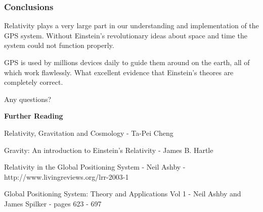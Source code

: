 \documentclass[xcolor=dvipsnames,usepdftitle=false]{beamer}
\begin{document}
\begin{frame}

\frametitle{Conclusions}

Relativity plays a very large part in our understanding and implementation of the GPS system. Without Einstein's revolutionary ideas about space and time the system could not function properly. \pause

\vspace{\baselineskip}

GPS is used by millions devices daily to guide them around on the earth, all of which work flawlessly. What excellent evidence that Einstein's theores are completely correct.

\end{frame}

\begin{frame}[plain]

\begin{center}
Any questions?
\end{center}

\vspace{\baselineskip}

\textbf{Further Reading} 

Relativity, Gravitation and Cosmology - Ta-Pei Cheng 

\vspace{\baselineskip}

Gravity: An introduction to Einstein's Relativity - James B. Hartle 

\vspace{\baselineskip}

Relativity in the Global Positioning System - Neil Ashby - http://www.livingreviews.org/lrr-2003-1 

\vspace{\baselineskip}

Global Positioning System: Theory and Applications Vol 1 - Neil Ashby and James Spilker - pages 623 - 697 
\end{frame}
\end{document}

